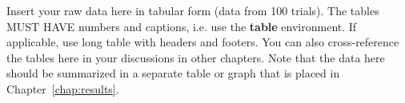 Insert your raw data here in tabular form (data from 100 trials).
The tables MUST HAVE numbers and captions, i.e. use the \textbf{table} environment.
If applicable, use long table with headers and footers.
You can also cross-reference the tables here in your discussions in other chapters.
Note that the data here should be summarized in a separate table or graph that is placed in Chapter~\ref{chap:results}.
